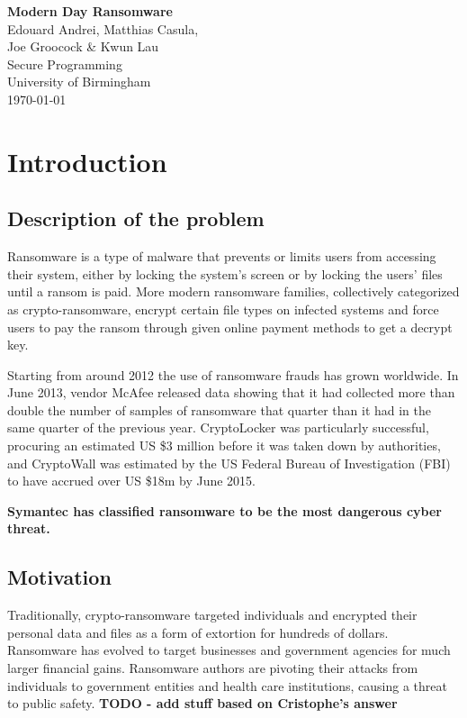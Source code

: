 \documentclass[10pt,a4paper]{article}
\begin{document}
\begin{titlepage}
  \vspace*{\fill}
  \begin{center}
    {\Huge \textbf{Modern Day Ransomware}}\\[0.5cm]
    {\Large Edouard Andrei, Matthias Casula,}\\
    {\Large Joe Groocock \& Kwun Lau}\\[0.6cm]
    {\large Secure Programming}\\
    {\large University of Birmingham}\\[0.4cm]
    {\large \today}
  \end{center}
  \vspace*{\fill}
  \tableofcontents
\end{titlepage}

\newpage

\section{Introduction}
\subsection{Description of the problem}
Ransomware is a type of malware that prevents or limits users from accessing their system, either by locking the system's screen or by locking the users' files until a ransom is paid. More modern ransomware families, collectively categorized as crypto-ransomware, encrypt certain file types on infected systems and force users to pay the ransom through given online payment methods to get a decrypt key.

Starting from around 2012 the use of ransomware frauds has grown worldwide. In June 2013, vendor McAfee released data showing that it had collected more than double the number of samples of ransomware that quarter than it had in the same quarter of the previous year. CryptoLocker was particularly successful, procuring an estimated US \$3 million before it was taken down by authorities, and CryptoWall was estimated by the US Federal Bureau of Investigation (FBI) to have accrued over US \$18m by June 2015.

\textbf{Symantec has classified ransomware to be the most dangerous cyber threat. \cite{symantec}}

\subsection{Motivation}
Traditionally, crypto-ransomware targeted individuals and encrypted their personal data and files as a form of extortion for hundreds of dollars. Ransomware has evolved to target businesses and government agencies for much larger financial gains. Ransomware authors are pivoting their attacks from individuals to government entities and health care institutions, causing a threat to public safety. \textbf{TODO - add stuff based on Cristophe's answer}
\end{document}
